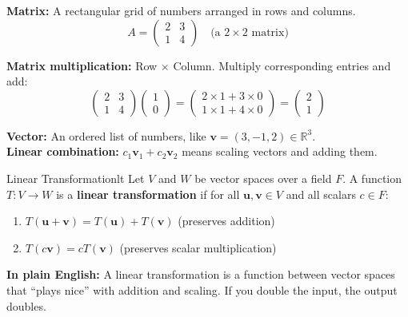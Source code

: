\documentclass[12pt,a4paper]{book}
\begin{document}
\begin{prereqbox}
\textbf{Matrix:} A rectangular grid of numbers arranged in rows and columns.
\[
A = \begin{pmatrix} 2 & 3 \\ 1 & 4 \end{pmatrix} \quad \text{(a $2 \times 2$ matrix)}
\]

\textbf{Matrix multiplication:} Row $\times$ Column. Multiply corresponding entries and add:
\[
\begin{pmatrix} 2 & 3 \\ 1 & 4 \end{pmatrix} \begin{pmatrix} 1 \\ 0 \end{pmatrix} = \begin{pmatrix} 2 \times 1 + 3 \times 0 \\ 1 \times 1 + 4 \times 0 \end{pmatrix} = \begin{pmatrix} 2 \\ 1 \end{pmatrix}
\]

\textbf{Vector:} An ordered list of numbers, like $\mathbf{v} = (3, -1, 2) \in \mathbb{R}^3$.\\
\textbf{Linear combination:} $c_1\mathbf{v}_1 + c_2\mathbf{v}_2$ means scaling vectors and adding them.
\end{prereqbox}

\begin{definition}{Linear Transformation}{lt}
Let $V$ and $W$ be vector spaces over a field $F$. A function $T: V \to W$ is a \textbf{linear transformation} if for all $\mathbf{u}, \mathbf{v} \in V$ and all scalars $c \in F$:
\begin{enumerate}[label=(\roman*)]
    \item $T(\mathbf{u} + \mathbf{v}) = T(\mathbf{u}) + T(\mathbf{v})$ \quad (preserves addition)
    \item $T(c\mathbf{v}) = cT(\mathbf{v})$ \quad (preserves scalar multiplication)
\end{enumerate}
\textbf{In plain English:} A linear transformation is a function between vector spaces that ``plays nice'' with addition and scaling. If you double the input, the output doubles.
\end{definition}
\end{document}
